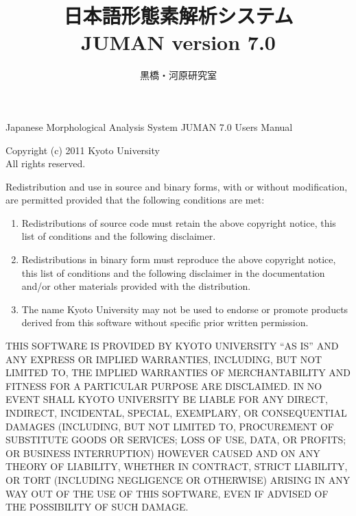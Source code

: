\documentclass[a4j,titlepage]{jarticle}
\title{\bf 日本語形態素解析システム \\ JUMAN version 7.0}
\author{黒橋・河原研究室}
\date{平成23年12月 \\
\rule{0mm}{110mm}Copyright \copyright\ 2011\begin{tabular}[t]{l}
                                京都大学大学院情報学研究科 \\
                                \end{tabular}
}
\begin{document}
\maketitle

\thispagestyle{empty}

\vspace*{\fill}

\begin{small}
\noindent
Japanese Morphological Analysis System JUMAN 7.0 Users Manual

\noindent
Copyright (c) 2011 Kyoto University \\
All rights reserved.

\noindent
Redistribution and use in source and binary forms, with or without
modification, are permitted provided that the following conditions
are met:

\begin{enumerate}
 \item Redistributions of source code must retain the above copyright
   notice, this list of conditions and the following disclaimer.
 \item Redistributions in binary form must reproduce the above copyright
   notice, this list of conditions and the following disclaimer in the
   documentation and/or other materials provided with the distribution.
 \item The name Kyoto University may not be used to endorse or promote
   products derived from this software without specific prior written
   permission.
\end{enumerate}

\noindent
THIS SOFTWARE IS PROVIDED BY KYOTO UNIVERSITY ``AS IS'' AND ANY
EXPRESS OR IMPLIED WARRANTIES, INCLUDING, BUT NOT LIMITED TO, THE
IMPLIED WARRANTIES OF MERCHANTABILITY AND FITNESS FOR A PARTICULAR
PURPOSE ARE DISCLAIMED.  IN NO EVENT SHALL KYOTO UNIVERSITY BE
LIABLE FOR ANY DIRECT, INDIRECT, INCIDENTAL, SPECIAL, EXEMPLARY, OR
CONSEQUENTIAL DAMAGES (INCLUDING, BUT NOT LIMITED TO, PROCUREMENT OF
SUBSTITUTE GOODS OR SERVICES; LOSS OF USE, DATA, OR PROFITS; OR BUSINESS
INTERRUPTION) HOWEVER CAUSED AND ON ANY THEORY OF LIABILITY, WHETHER IN
CONTRACT, STRICT LIABILITY, OR TORT (INCLUDING NEGLIGENCE OR OTHERWISE)
ARISING IN ANY WAY OUT OF THE USE OF THIS SOFTWARE, EVEN IF ADVISED OF
THE POSSIBILITY OF SUCH DAMAGE.


\vspace{1cm}


\end{small}
\end{document}
